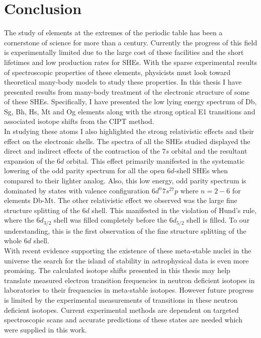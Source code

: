 \documentclass[10pt,a4paper, twoside, openright]{report}
\begin{document}
\chapter{Conclusion} \label{chap:P2Conc}
The study of elements at the extremes of the periodic table has been a cornerstone of science for more than a century. Currently the progress of this field is experimentally limited due to the large cost of these facilities and the short lifetimes and low production rates for SHEs. With the sparse experimental results of spectroscopic properties of these elements, physicists must look toward theoretical many-body models to study these properties. In this thesis I have presented results from many-body treatment of the electronic structure of some of these SHEs. Specifically, I have presented the low lying energy spectrum of Db, Sg, Bh, Hs, Mt and Og elements along with the strong optical E1 transitions and associated isotope shifts from the CIPT method. \\
\linebreak
In studying these atoms I also highlighted the strong relativistic effects and their effect on the electronic shells. The spectra of all the SHEs studied displayed the direct and indirect effects of the contraction of the $7s$ orbital and the resultant expansion of the $6d$ orbital. This effect primarily manifested in the systematic lowering of the odd parity spectrum for all the open $6d$-shell SHEs when compared to their lighter analog. Also, this low energy, odd parity spectrum is dominated by states with valence configuration $6d^{n}7s^27p$ where $n=2-6$ for elements Db-Mt. The other relativistic effect we observed was the large fine structure splitting of the $6d$ shell. This manifested in the violation of Hund's rule, where the $6d_{3/2}$ shell was filled completely before the $6d_{5/2}$ shell is filled. To our understanding, this is the first observation of the fine structure splitting of the whole $6d$ shell.\\
\linebreak
With recent evidence supporting the existence of these meta-stable nuclei in the universe \cite{Alexandrov2019} the search for the island of stability in astrophysical data is even more promising. The calculated isotope shifts presented in this thesis may help translate measured electron transition frequencies in neutron deficient isotopes in laboratories to their frequencies in meta-stable isotopes. However future progress is limited by the experimental measurements of transitions in these neutron deficient isotopes. Current experimental methods are dependent on targeted spectroscopic scans and accurate predictions of these states are needed which were supplied in this work.\\
\end{document}
